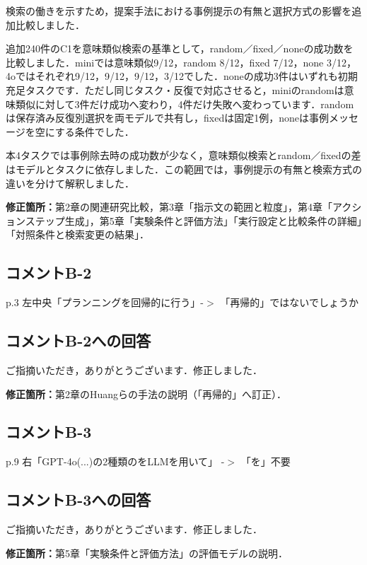 \documentclass{jsarticle}
\begin{document}
検索の働きを示すため，提案手法における事例提示の有無と選択方式の影響を追加比較しました．

追加240件のC1を意味類似検索の基準として，random／fixed／noneの成功数を比較しました．miniでは意味類似9/12，random 8/12，fixed 7/12，none 3/12，4oではそれぞれ9/12，9/12，9/12，3/12でした．noneの成功3件はいずれも初期充足タスクです．ただし同じタスク・反復で対応させると，miniのrandomは意味類似に対して3件だけ成功へ変わり，4件だけ失敗へ変わっています．randomは保存済み反復別選択を両モデルで共有し，fixedは固定1例，noneは事例メッセージを空にする条件でした．

本4タスクでは事例除去時の成功数が少なく，意味類似検索とrandom／fixedの差はモデルとタスクに依存しました．この範囲では，事例提示の有無と検索方式の違いを分けて解釈しました．

\noindent\textbf{修正箇所：}第2章の関連研究比較，第3章「指示文の範囲と粒度」，第4章「アクションステップ生成」，第5章「実験条件と評価方法」「実行設定と比較条件の詳細」「対照条件と検索変更の結果」．


\subsection*{コメントB-2}
\begin{screen}
p.3 左中央「プランニングを回帰的に行う」-$>$ 「再帰的」ではないでしょうか
\end{screen}

\subsection*{コメントB-2への回答}
ご指摘いただき，ありがとうございます．修正しました．

\noindent\textbf{修正箇所：}第2章のHuangらの手法の説明（「再帰的」へ訂正）．


\subsection*{コメントB-3}
\begin{screen}
p.9 右「GPT-4o(...)の2種類のをLLMを用いて」 -$>$ 「を」不要
\end{screen}

\subsection*{コメントB-3への回答}
ご指摘いただき，ありがとうございます．修正しました．

\noindent\textbf{修正箇所：}第5章「実験条件と評価方法」の評価モデルの説明．
\end{document}

